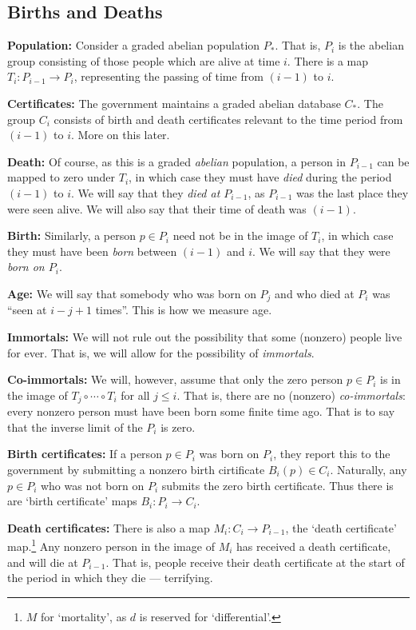 \documentclass[11pt]{article}
\newcommand{\myheading}[1]
{{\noindent\Large #1}

}
\renewcommand{\myheading}[1]{\subsection{#1}}
\begin{document}
\begin{Births Deaths and Marriages}
\myheading{Births and Deaths}
\indent\Bullet \textbf{Population:} Consider a graded abelian population $P_*$. That
is, $P_i$ is the abelian group consisting of those people which are alive at
time $i$. There is a map $T_{i}:P_{i-1}\to P_{i}$, representing the passing of
time from $(i-1)$ to $i$.

\Bullet \textbf{Certificates:} The government maintains a graded abelian
database $C_*$. The group $C_i$ consists of birth and death certificates
relevant to the time period from $(i-1)$ to $i$. More on this later.

\Bullet \textbf{Death:} Of course, as this is a graded \emph{abelian}
population, a person in $P_{i-1}$ can be mapped to zero under $T_{i}$, in which
case they must have \emph{died} during the period $(i-1)$ to $i$. We will say
that they \emph{died at $P_{i-1}$}, as $P_{i-1}$ was the last place they were
seen alive. We will also say that their time of death was $(i-1)$.

\Bullet \textbf{Birth:} Similarly, a person $p\in P_i$ need not be in the image
of $T_{i}$, in which case they must have been \emph{born} between $(i-1)$ and
$i$. We will say that they were \emph{born on $P_i$}.

\Bullet \textbf{Age:} We will say that somebody who was born on $P_j$ and who
died at $P_i$ was ``seen at $i-j+1$ times''. This is how we measure age.

\Bullet \textbf{Immortals:} We will not rule out the possibility that some
(nonzero) people live for ever. That is, we will allow for the possibility of
\emph{immortals}.

\Bullet \textbf{Co-immortals:} We will, however, assume that only the zero
person $p\in P_i$ is in the image of $T_{j}\circ\cdots\circ T_i$ for all $j\leq
i$. That is, there are no (nonzero) \emph{co-immortals}: every nonzero person
must have been born some finite time ago. That is to say that the inverse limit
of the $P_i$ is zero.

\Bullet \textbf{Birth certificates:} If a person $p\in P_{i}$ was born on $P_i$,
they report this to the government by submitting a nonzero birth cirtificate
$B_{i}(p)\in C_i$. Naturally, any $p\in P_{i}$ who was not born on $P_i$ submits
the zero birth certificate. Thus there is are `birth certificate' maps
$B_i:P_i\to C_i$.

\Bullet \textbf{Death certificates:} There is also a map $M_{i}:C_{i}\to
P_{i-1}$, the `death certificate' map.\footnote{$M$ for `mortality', as $d$ is
reserved for `differential'.} Any nonzero person in the image of $M_{i}$ has
received a death certificate, and will die at $P_{i-1}$. That is, people receive
their death certificate at the start of the period in which they die ---
terrifying.


\end{Births Deaths and Marriages}
\end{document}
